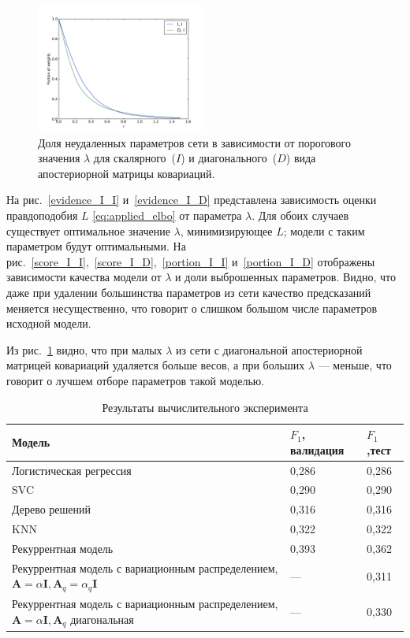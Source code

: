\begin{figure}[!h]
	\centering
	\includegraphics[width=0.5\textwidth]{plots/smerdov/lambdas.pdf}
	\caption{Доля неудаленных параметров сети в зависимости от порогового значения $\lambda$ для скалярного~($I$) и диагонального~($D$) вида апостериорной матрицы ковариаций.}
	\label{lambdas}
\end{figure}

 

На рис.~\ref{evidence_I_I} и~\ref{evidence_I_D} представлена зависимость оценки правдоподобия $L$ \eqref{eq:applied_elbo} от параметра $\lambda$.
Для обоих случаев существует оптимальное значение $\lambda$, минимизирующее $L$; модели с таким параметром будут оптимальными. На рис.~\ref{score_I_I},~\ref{score_I_D},~\ref{portion_I_I} и~\ref{portion_I_D} отображены зависимости качества модели от $\lambda$ и доли выброшенных параметров. Видно, что даже при удалении большинства параметров из сети качество предсказаний меняется несущественно, что говорит о слишком большом числе параметров исходной модели.

Из рис.~\ref{lambdas} видно, что при малых $\lambda$ из сети с диагональной апостериорной матрицей ковариаций удаляется больше весов, а при больших $\lambda$ --- меньше, что говорит о лучшем отборе параметров такой моделью.


\begin{table}[!htp]
	\centering
	\caption{Результаты вычислительного эксперимента}
	\label{my-label}
	\begin{tabularx}{\textwidth}{|X|l|l|}
		\hline
		\bf Модель          & $F_1$, \bf валидация & $F_1$,\bf тест\\ \hline
		Логистическая регрессия   & 0,286                 & 0,286            \\ \hline
		SVC                    & 0,290                 & 0,290            \\ \hline
		Дерево решений & 0,316                 & 0,316            \\ \hline
		KNN   & 0,322                 & 0,322            \\ \hline
		Рекуррентная модель                    & 0,393                 & 0,362            \\ \hline
		Рекуррентная модель с вариационным распределением, $\mathbf{A} = \alpha\mathbf{I}, \mathbf{A}_q = \alpha_q\mathbf{I}$  &  ---                     & 0,311            \\ \hline
		Рекуррентная модель с вариационным распределением, $\mathbf{A} = \alpha\mathbf{I}, \mathbf{A}_q$ диагональная   &  ---                     & 0,330             \\ \hline
	\end{tabularx}
\end{table}


